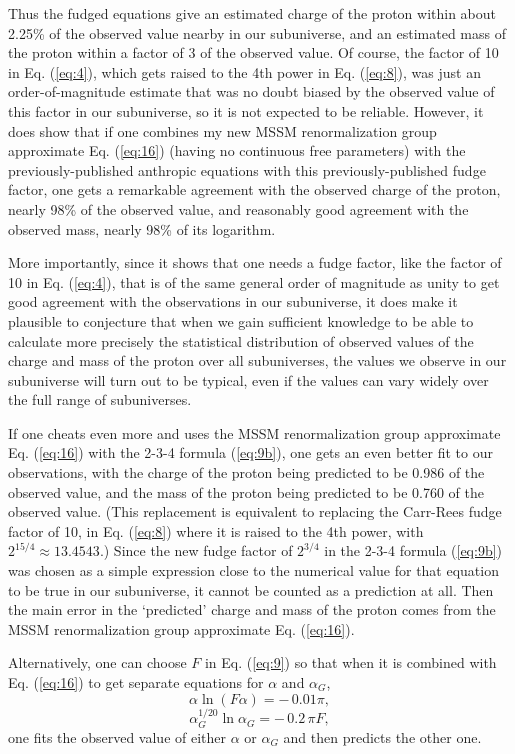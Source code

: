 \documentclass[a4paper,12pt]{article}
\begin{document}
	Thus the fudged equations give an estimated charge
of the proton within about 2.25\% of the observed value
nearby in our subuniverse, and an estimated mass of the proton
within a factor of 3 of the observed value.
Of course, the factor of 10 in Eq. (\ref{eq:4}),
which gets raised to the 4th power in Eq. (\ref{eq:8}),
was just an order-of-magnitude estimate that was no doubt biased
by the observed value of this factor in our subuniverse,
so it is not expected to be reliable.
However, it does show that if one combines my
new MSSM renormalization group approximate Eq. (\ref{eq:16})
(having no continuous free parameters)
with the previously-published anthropic equations with
this previously-published fudge factor,
one gets a remarkable agreement with the observed
charge of the proton, nearly 98\% of the observed value,
and reasonably good agreement with the observed mass,
nearly 98\% of its logarithm.

	More importantly, since it shows that one needs
a fudge factor, like the factor of 10 in Eq. (\ref{eq:4}),
that is of the same general
order of magnitude as unity to get good agreement with
the observations in our subuniverse, it does make it
plausible to conjecture that when we gain sufficient
knowledge to be able to calculate more precisely
the statistical distribution of observed values
of the charge and mass of the proton over all subuniverses,
the values we observe in our subuniverse will turn out
to be typical, even if the values can vary
widely over the full range of subuniverses.

	If one cheats even more and uses the
MSSM renormalization group approximate Eq. (\ref{eq:16})
with the 2-3-4 formula (\ref{eq:9b}),
one gets an even better fit to our observations,
with the charge of the proton being predicted
to be 0.986 of the observed value,
and the mass of the proton being predicted to be
0.760 of the observed value.
(This replacement is equivalent to replacing
the Carr-Rees fudge factor of 10,
in Eq. (\ref{eq:8}) where it is raised to the 4th power,
with $2^{15/4} \approx 13.4543$.)
Since the new fudge factor of $2^{3/4}$ in the 2-3-4 formula (\ref{eq:9b})
was chosen as a simple expression close to the numerical
value for that equation to be true in our subuniverse,
it cannot be counted as a prediction at all.
Then the main error in the `predicted' charge and mass of the
proton comes from the
MSSM renormalization group approximate Eq. (\ref{eq:16}).

	Alternatively, one can choose $F$ in Eq. (\ref{eq:9})
so that when it is combined with Eq. (\ref{eq:16})
to get separate equations for $\alpha$ and $\alpha_G$,
 \begin{equation}
 \alpha\ln{(F\alpha)} = -\,0.01\pi,
 \label{eq:36}
 \end{equation}
 \begin{equation}
 \alpha_G^{1/20}\ln{\alpha_G} = -\,0.2\,\pi F,
 \label{eq:37}
 \end{equation}
one fits the observed value of either $\alpha$ or $\alpha_G$
and then predicts the other one.
\end{document}
